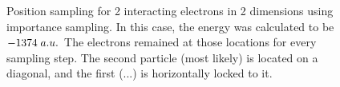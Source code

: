 \documentclass[11pt,a4paper,titlepage]{article}
\begin{document}
\begin{figure}[H]
\center
{}
\caption[numerically unstable run- electron positions]{Position sampling for 2 interacting electrons in 2 dimensions using importance sampling. In this case, the energy was calculated to be $-1374\hspace{1mm} a.u.$ The electrons remained at those locations for every sampling step. The second particle (most likely) is located on a diagonal, and the first (...) is horizontally locked to it.}
\label{fig:posSampling_unstable}
\end{figure}
\end{document}
